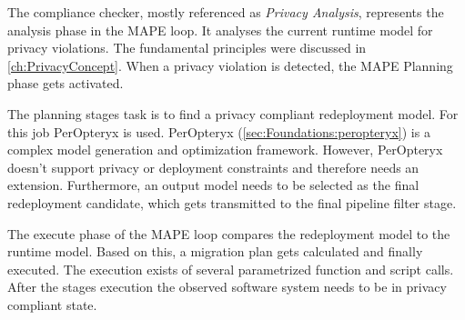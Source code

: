The compliance checker, mostly referenced as \textit{Privacy Analysis}, represents the analysis phase in the MAPE loop. It analyses the current runtime model for privacy violations. The fundamental principles were discussed in \autoref{ch:PrivacyConcept}. When a privacy violation is detected, the MAPE Planning phase gets activated.

The planning stages task is to find a privacy compliant redeployment model. For this job PerOpteryx is used. PerOpteryx (\autoref{sec:Foundations:peropteryx}) is a complex model generation and optimization framework. However, PerOpteryx doesn't support privacy or deployment constraints and therefore needs an extension. Furthermore, an output model needs to be selected as the final redeployment candidate, which gets transmitted to the final pipeline filter stage.

The execute phase of the MAPE loop compares the redeployment model to the runtime model. Based on this, a migration plan gets calculated and finally executed. The execution exists of several parametrized function and script calls. After the stages execution the observed software system needs to be in privacy compliant state.


